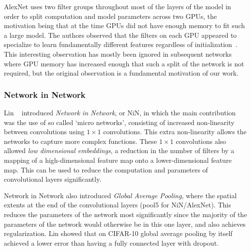 \documentclass[thesis]{subfiles}
\begin{document}
AlexNet uses two filter groups throughout most of the layers of the model in order to split computation and model parameters across two GPUs, the motivation being that at the time GPUs did not have enough memory to fit such a large model. The authors observed that the filters on each GPU appeared to specialize to learn fundamentally different features regardless of initialization~\cite{Krizhevsky2012imanet}. This interesting observation has mostly been ignored in subsequent networks where GPU memory has increased enough that such a split of the network is not required, but the original observation is a fundamental motivation of our work.

\subsubsection{Network in Network}
Lin \etal~\cite{Lin2013NiN} introduced \emph{Network in Network}, or NiN, in which the main contribution was the use of so called `micro networks', consisting of increased non-linearity between convolutions using $1\times 1$ convolutions. This extra non-linearity allows the networks to capture more complex functions. These $1\times 1$ convolutions also allowed \emph{low dimensional embeddings}, \ie a reduction in the number of filters by a mapping of a high-dimensional feature map onto a lower-dimensional feature map. This can be used to reduce the computation and parameters of convolutional layers significantly. 

Network in Network also introduced \emph{Global Average Pooling}, where the spatial extents at the end of the convolutional layers (\ie pool5 for NiN/AlexNet). This reduces the parameters of the network most significantly since the majority of the parameters of the network would otherwise be in this one layer, and also achieves regularization. Lin \etal showed that on CIFAR-10 global average pooling by itself achieved a lower error than having a fully connected layer with dropout.
\end{document}
